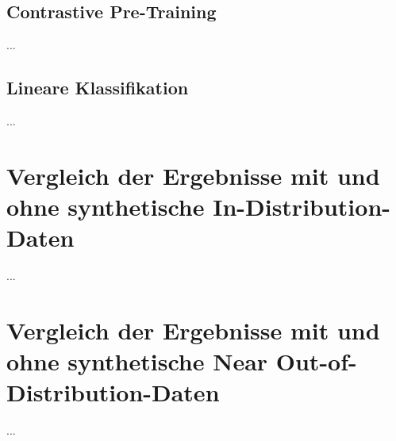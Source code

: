 \subsection{Contrastive Pre-Training}

...

\subsection{Lineare Klassifikation}

...

\section{Vergleich der Ergebnisse mit und ohne synthetische In-Distribution-Daten}

...

\section{Vergleich der Ergebnisse mit und ohne synthetische Near Out-of-Distribution-Daten}

...

